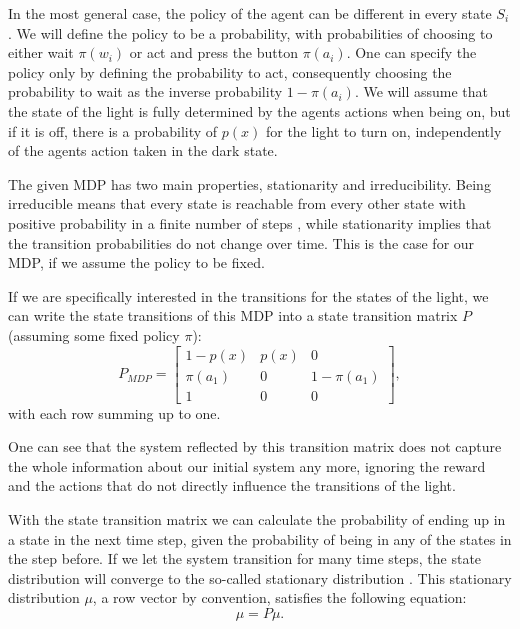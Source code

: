 \documentclass[12pt,a4paper]{article}
\begin{document}
In the most general case, the policy of the agent can be different in every state $S_i$.
We will define the policy to be a probability, with probabilities of choosing to either wait $\pi(w_i)$ or act and press the button $\pi(a_i)$. One can specify the policy only by defining the probability to act, consequently choosing the probability to wait as the inverse probability $1-\pi(a_i)$.
We will assume that the state of the light is fully determined by the agents actions when being on, but if it is off, there is a probability of $p(x)$ for the light to turn on, independently of the agents action taken in the dark state.

The given MDP has two main properties, stationarity and irreducibility.
Being irreducible means that every state is reachable from every other state with positive probability in a finite number of steps \autocite{cover1999elements}, while stationarity implies that the transition probabilities do not change over time.
This is the case for our MDP, if we assume the policy to be fixed.

If we are specifically interested in the transitions for the states of the light, we can write the state transitions of this MDP into a state transition matrix $P$ (assuming some fixed policy $\pi$):
\begin{equation}
    \label{eq:P_mdp}
    P_{MDP} =
    \begin{bmatrix} 1 - p(x) & p(x) & 0            \\
                \pi(a_1) & 0    & 1 - \pi(a_1) \\
                1        & 0    & 0
    \end{bmatrix},
\end{equation}
with each row summing up to one.

One can see that the system reflected by this transition matrix does not capture the whole information about our initial system any more, ignoring the reward and the actions that do not directly influence the transitions of the light.

With the state transition matrix we can calculate the probability of ending up in a state in the next time step, given the probability of being in any of the states in the step before.
If we let the system transition for many time steps, the state distribution will converge to the so-called stationary distribution \autocite{cover1999elements}.
This stationary distribution $\mu$, a row vector by convention, satisfies the following equation:
\begin{equation}
    \label{eq:stationary_dist}
    \mu = P \mu.
\end{equation}
\end{document}
